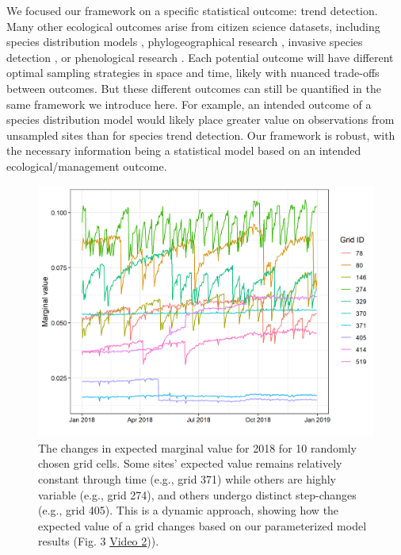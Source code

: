 \documentclass[9pt,twocolumn,twoside,lineno]{pnas-new}
\begin{document}
We focused our framework on a specific statistical outcome: trend detection. Many other ecological outcomes arise from citizen science datasets, including species distribution models \cite{bradsworth2017species, van2013opportunistic}, phylogeographical research \cite{bahls2014new, drury2019continent}, invasive species detection \cite{pocock2017citizen, grason2018citizen}, or phenological research \cite{la2014role, supp2015citizen}. Each potential outcome will have different optimal sampling strategies in space and time, likely with nuanced trade-offs between outcomes. But these different outcomes can still be quantified in the same framework we introduce here. For example, an intended outcome of a species distribution model would likely place greater value on observations from unsampled sites \cite{crawley2001scale} than for species trend detection. Our framework is robust, with the necessary information being a statistical model based on an intended ecological/management outcome.

\begin{figure}[!hb]
\centering
\includegraphics[width=.8\linewidth]{example_grids_through_time.png}
\caption{The changes in expected marginal value for 2018 for 10 randomly chosen grid cells. Some sites' expected value remains relatively constant through time (e.g., grid 371) while others are highly variable (e.g., grid 274), and others undergo distinct step-changes (e.g., grid 405). This is a dynamic approach, showing how the expected value of a grid changes based on our parameterized model results (Fig. 3 \href{https://github.com/coreytcallaghan/optimize_citizen_science_obs/blob/master/Figures/dynamic_map.gif}{Video 2})).}
\label{fig4}
\end{figure}
\end{document}
